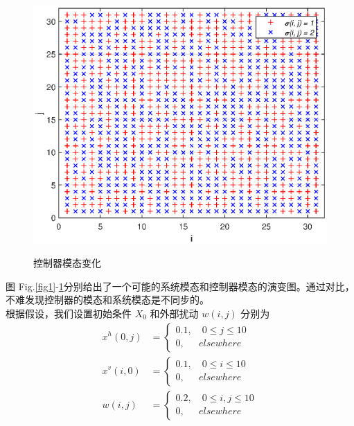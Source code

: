 	\begin{figure}[!htb]
		\centering\includegraphics[scale=0.6]{./figures/2dsmc/simulations/sigma_eps.eps}\\ 
		\caption{控制器模态变化}
		\label{fig2}
	\end{figure}
	图 Fig.\ref{fig1}-\ref{fig2}分别给出了一个可能的系统模态和控制器模态的演变图。通过对比，不难发现控制器的模态和系统模态是不同步的。\\
	根据假设，我们设置初始条件 $X_{0}$ 和外部扰动 $w(i,j)$ 分别为
	\begin{equation*}
	\begin{aligned}
	x^{h}(0, j)&=\begin{cases}
	0.1, \quad 0\leq j \leq 10 \\
	0, \quad \ \ elsewhere
	\end{cases} \\
	x^{v}(i, 0)&=\begin{cases}
	0.1, \quad 0\leq i \leq 10 \\
	0, \quad \ \ elsewhere
	\end{cases}\\
	w(i, j)\ &=\begin{cases}
	0.2, \quad 0\leq i,j \leq 10 \\
	0, \quad \ \ elsewhere
	\end{cases}
	\end{aligned}
	\end{equation*}

